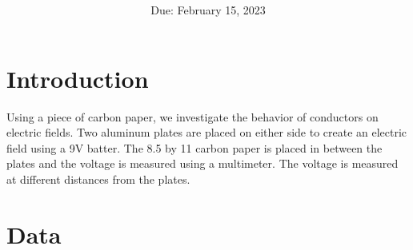 \documentclass[article, 12pt]{article}
\title{
    \vspace{2in}
    \textmd{\textbf{\labTitle}}
    \normalsize\vspace{0.1in}\\
    \vspace{0.1in}\large{\text{\class: \professor}}
    \vspace{3in}
}
\author{\name}
\date{Due: February 15, 2023}
\begin{document}
    \maketitle
    \thispagestyle{empty}
    \pagebreak
    \section{Introduction}
    Using a piece of carbon paper, we investigate the behavior of conductors on electric fields. Two aluminum plates are placed on either side to create an electric field using a 9V batter. The 8.5 by 11 carbon paper is placed in between the plates and the voltage is measured using a multimeter. The voltage is measured at different distances from the plates.

    \section{Data}
\end{document}
